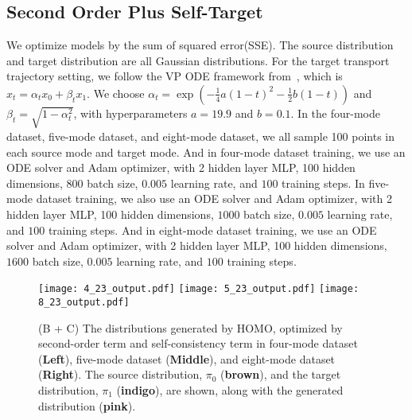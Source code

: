 \subsection{Second Order Plus Self-Target}\label{sec:app:second_order_plus_self_target}
We optimize models by the sum of squared error(SSE). The source distribution and target distribution are all Gaussian distributions. For the target transport trajectory setting, we follow the VP ODE framework from~\cite{rectified_flow}, which is $x_t = \alpha_t x_0 + \beta_t x_1$. We choose $\alpha_t = \exp(-\frac{1}{4} a(1-t)^2 - \frac{1}{2} b(1-t))$ and $\beta_t = \sqrt{1 - \alpha_t^2}$, with hyperparameters $a = 19.9$ and $b = 0.1$. In the four-mode dataset, five-mode dataset, and eight-mode dataset, we all sample 100 points in each source mode and target mode. And in four-mode dataset training, we use an ODE solver and Adam optimizer, with 2 hidden layer MLP, 100 hidden dimensions, $800$ batch size, $0.005$ learning rate, and $100$ training steps. In five-mode dataset training, we also use an ODE solver and Adam optimizer, with 2 hidden layer MLP, 100 hidden dimensions, $1000$ batch size, $0.005$ learning rate, and $100$ training steps. And in eight-mode dataset training, we use an ODE solver and Adam optimizer, with 2 hidden layer MLP, 100 hidden dimensions, $1600$ batch size, $0.005$ learning rate, and $100$ training steps. 
\begin{figure}[!ht]
\centering
\texttt{[image: 4\_23\_output.pdf]}
\texttt{[image: 5\_23\_output.pdf]}
\texttt{[image: 8\_23\_output.pdf]}
\caption{
(B + C) The distributions generated by HOMO, optimized by second-order term and self-consistency term in four-mode dataset (\textbf{Left}), five-mode dataset (\textbf{Middle}), and eight-mode dataset (\textbf{Right}). 
The source distribution, $\pi_0$ ({\textbf{brown}}), and the target distribution, $\pi_1$ ({\textbf{indigo}}), are shown, along with the generated distribution ({\textbf{pink}}). 
}
\label{fig:23_distribution}
\end{figure}

